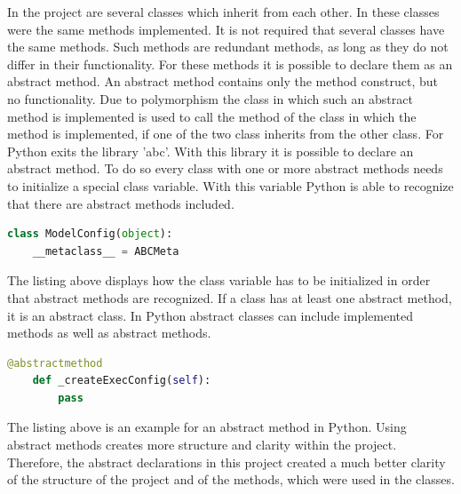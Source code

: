 In the project are several classes which inherit from each other. In these classes were the same methods implemented. It is not required that several classes have the same methods. Such methods are redundant methods, as long as they do not differ in their functionality. For these methods it is possible to declare them as an abstract method. An abstract method contains only the method construct, but no functionality. Due to polymorphism the class in which such an abstract method is implemented is used to call the method of the class in which the method is implemented, if one of the two class inherits from the other class. \newline
For Python exits the library 'abc'. With this library it is possible to declare an abstract method. To do so every class with one or more abstract methods needs to initialize a special class variable. With this variable Python is able to recognize that there are abstract methods included.

\begin{lstlisting}[language=Python, caption = The initialization of a class variable which is required by Python in order to detect abstract methods and abstract classes.]
class ModelConfig(object):
    __metaclass__ = ABCMeta
\end{lstlisting}

The listing above displays how the class variable has to be initialized in order that abstract methods are recognized. If a class has at least one abstract method, it is an abstract class. In Python abstract classes can include implemented methods as well as abstract methods.

\begin{lstlisting}[language=Python, caption = Declaration of an abstract method.]
    @abstractmethod
    def _createExecConfig(self):
        pass
\end{lstlisting}

The listing above is an example for an abstract method in Python. Using abstract methods creates more structure and clarity within the project. Therefore, the abstract declarations in this project created a much better clarity of the structure of the project and of the methods, which were used in the classes.

